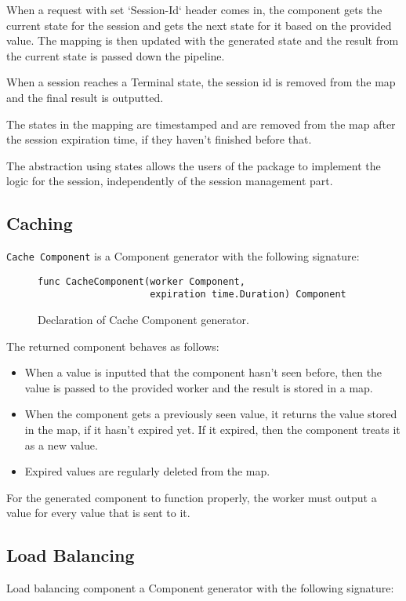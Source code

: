 \documentclass[12pt,a4paper]{article}
\begin{document}
When a request with set `Session-Id` header comes in, the component gets the current 
state for the session and gets the next state for it based on the provided value.
The mapping is then updated with the generated state and the result from the current state
is passed down the pipeline.

When a session reaches a Terminal state, the session id is removed from the map
and the final result is outputted.

The states in the mapping are timestamped and are removed from the map after
the session expiration time, if they haven't finished before that.

The abstraction using states allows the users of the package to implement the
logic for the session, independently of the session management part.

\subsection{Caching}
\texttt{Cache Component} is a Component generator with the following signature:

\begin{figure}[h]
\centering
\begin{lstlisting}
func CacheComponent(worker Component, 
					expiration time.Duration) Component
\end{lstlisting}
\caption[scale=1.0]{Declaration of Cache Component generator.}
\label{fig:cacheComp}
\end{figure}

The returned component behaves as follows:
\begin{itemize}
	\item When a value is inputted that the component hasn't seen before, then
				the value is passed to the provided worker and the result is stored in
				a map.
	\item When the component gets a previously seen value, it returns the value
			  stored in the map, if it hasn't expired yet. If it expired, then the component
				treats it as a new value.
	\item Expired values are regularly deleted from the map.
\end{itemize}

For the generated component to function properly, the worker must output
a value for every value that is sent to it.

\subsection{Load Balancing}
Load balancing component a Component generator with the following signature:
\end{document}
